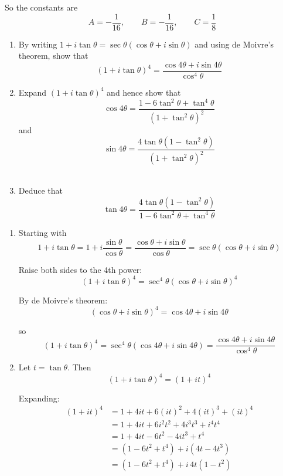\documentclass[leqno]{article}
\begin{document}
\begin{enumerate}[
  label=\textbf{\arabic*.},
  leftmargin=*,
  topsep=0pt,
  partopsep=0pt,
  parsep=0pt
]
\begin{djsSolution}
\begin{enumerate}[label=\textbf{(\alph*)}]
So the constants are
\[
A=-\frac{1}{16},\qquad B=-\frac{1}{16},\qquad C=\frac{1}{8}
\]
\end{enumerate}
\end{djsSolution}


\newpage

\questionitem

\begin{enumerate}[label=\textbf{(\alph*)}]
  \item By writing $1+i\tan\theta = \sec\theta(\cos\theta + i\sin\theta)$ and using de Moivre's theorem, show that
  \[
  (1+i\tan\theta)^4 = \frac{\cos 4\theta + i\sin 4\theta}{\cos^4\theta}
  \]
  \item Expand $(1+i\tan\theta)^4$ and hence show that
  \[
  \cos 4\theta = \frac{1-6\tan^2\theta+\tan^4\theta}{(1+\tan^2\theta)^2}
  \]
  and
  \[
  \sin 4\theta = \frac{4\tan\theta(1-\tan^2\theta)}{(1+\tan^2\theta)^2}
  \]
   \\
  \item Deduce that
  \[
  \tan 4\theta = \frac{4\tan\theta(1-\tan^2\theta)}{1-6\tan^2\theta+\tan^4\theta}
  \]
\end{enumerate}

\vspace*{10pt}

\begin{djsSolution}
\begin{enumerate}[label=\textbf{(\alph*)}]
  \item Starting with
  \[
  1+i\tan\theta
  =1+i\frac{\sin\theta}{\cos\theta}
  =\frac{\cos\theta+i\sin\theta}{\cos\theta}
  =\sec\theta(\cos\theta+i\sin\theta)
  \]

  Raise both sides to the 4th power:
  \[
  (1+i\tan\theta)^4=\sec^4\theta(\cos\theta+i\sin\theta)^4
  \]

  By de Moivre's theorem:
  \[
  (\cos\theta+i\sin\theta)^4=\cos4\theta+i\sin4\theta
  \]

  so
  \[
  (1+i\tan\theta)^4=\sec^4\theta(\cos4\theta+i\sin4\theta)
  =\frac{\cos4\theta+i\sin4\theta}{\cos^4\theta}
  \]

  \item Let $t=\tan\theta$. Then
  \[
  (1+i\tan\theta)^4=(1+it)^4
  \]

  Expanding:
  \begin{align*}
  (1+it)^4
  &=1+4it+6(it)^2+4(it)^3+(it)^4 \\
  &=1+4it+6i^2t^2+4i^3t^3+i^4t^4 \\
  &=1+4it-6t^2-4it^3+t^4 \\
  &=(1-6t^2+t^4)+i(4t-4t^3) \\
  &=(1-6t^2+t^4)+i\,4t(1-t^2)
  \end{align*}


\end{enumerate}
\end{djsSolution}
\end{enumerate}
\end{document}
